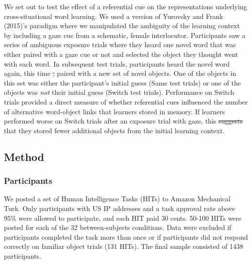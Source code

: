 \documentclass[authoryear, review]{elsarticle}
\providecommand{\DIFaddtex}[1]{{\protect\color{blue}\uwave{#1}}} %
\providecommand{\DIFdeltex}[1]{{\protect\color{red}\sout{#1}}}                      %
\providecommand{\DIFaddbegin}{} %
\providecommand{\DIFaddend}{} %
\providecommand{\DIFdelbegin}{} %
\providecommand{\DIFdelend}{} %
\providecommand{\DIFadd}[1]{\texorpdfstring{\DIFaddtex{#1}}{#1}} %
\providecommand{\DIFdel}[1]{\texorpdfstring{\DIFdeltex{#1}}{}} %
\begin{document}
We set out to test the effect of a referential cue on the
representations underlying cross-situational word learning. We used a
version of Yurovsky and Frank (2015)'s paradigm where we manipulated the
ambiguity of the learning context by including a gaze cue from a
schematic, female interlocutor. Participants saw a series of ambiguous
exposure trials where they heard one novel word that was either paired
with a gaze cue or not and selected the object they thought went with
each word. In subsequent test trials, participants heard the novel word
again, this time \DIFdelbegin \DIFdel{, }\DIFdelend paired with a new set of novel objects. One of the
objects in this set was either the participant's initial guess (Same
test trials) or one of the objects was \emph{not} their initial guess
(Switch test trials). Performance on Switch trials provided a direct
measure of whether referential cues influenced the number of alternative
word-object links that learners stored in memory. If learners performed
worse on Switch trials after an exposure trial with gaze, this \DIFdelbegin \DIFdel{suggests
}\DIFdelend \DIFaddbegin \DIFadd{would
suggest }\DIFaddend that they stored fewer additional objects from the initial
learning context.

\subsection{Method}\label{method}

\subsubsection{Participants}\label{participants}

We posted a set of Human Intelligence Tasks (HITs) to Amazon Mechanical
Turk. Only participants with US IP addresses and a task approval rate
above 95\% were allowed to participate, and each HIT paid 30 cents.
50-100 HITs were posted for each of the 32 between-subjects conditions.
Data were excluded if participants completed the task more than once or
if participants did not respond correctly on familiar object trials (131
HITs). The final sample consisted of 1438 participants.
\end{document}
